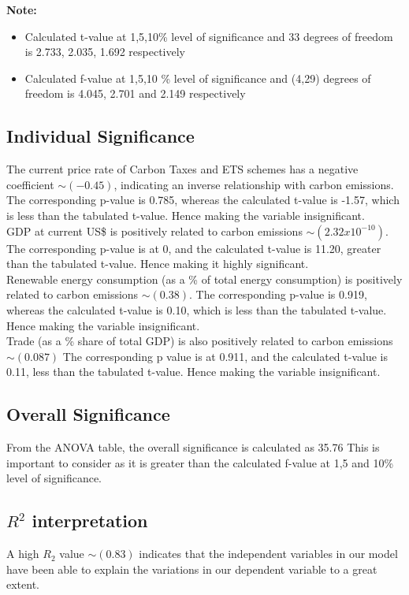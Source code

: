 \documentclass[12pt]{article}
\begin{document}
\textbf{Note:}
\begin{itemize}
    \item Calculated t-value at 1,5,10\% level of significance and 33 degrees of freedom is 2.733, 2.035, 1.692 respectively
    \item Calculated f-value at 1,5,10 \% level of significance and (4,29) degrees of freedom is 4.045, 2.701 and 2.149 respectively

\end{itemize}


\subsection{Individual Significance}
\label{sec:Individual-significance}
The current price rate of Carbon Taxes and ETS schemes has a negative coefficient \(\sim(-0.45)\), indicating an inverse relationship with carbon emissions. The corresponding p-value is 0.785, whereas the calculated t-value is -1.57, which is less than the tabulated t-value. Hence making the variable insignificant.
\\[\baselineskip]
GDP at current US\$ is positively related to carbon emissions \(\sim(2.32x10^{-10})\). The corresponding p-value is at  0, and the calculated t-value is 11.20, greater than the tabulated t-value. Hence making it highly significant.
\\[\baselineskip]
Renewable energy consumption (as a \% of total energy consumption) is positively related to carbon emissions \(\sim(0.38)\). The corresponding p-value is 0.919, whereas the calculated t-value is 0.10, which is less than the tabulated t-value. Hence making the variable insignificant.
\\[\baselineskip]
Trade (as a \% share of total GDP) is also positively related to carbon emissions \(\sim(0.087)\) The corresponding p value is at  0.911, and the calculated t-value is 0.11, less than the tabulated t-value. Hence making the variable insignificant.


\subsection{Overall Significance}
\label{sec:overall-significance}
From the ANOVA table, the overall significance is calculated as 35.76 This is important to consider as it is greater than the calculated f-value at 1,5 and 10\% level of significance. 

\subsection{\(R^{2}\) interpretation}
A high \(R_{2}\) value \(\sim(0.83)\) indicates that the independent variables in our model have been able to explain the variations in our dependent variable to a great extent.
\end{document}
